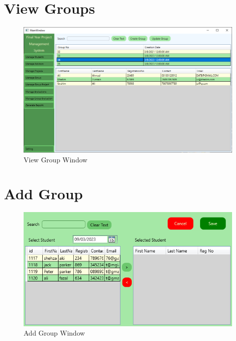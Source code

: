 \documentclass[a4paper, 12pt, oneside]{uet_thesis}
\begin{document}
\section{View Groups}
\begin{figure}[h]
    \centering
    \includegraphics[width=1\textwidth]{Figures/viewGroups.png}
    \caption{View Group Window}
    \label{fig:my_label}
\end{figure}
\clearpage

\section{Add Group}
\begin{figure}[h]
    \centering
    \includegraphics[width=1\textwidth]{Figures/AddGroup.png}
    \caption{Add Group Window}
    \label{fig:my_label}
\end{figure}
\end{document}
